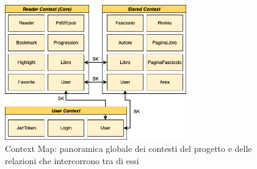 \begin{figure}[H]
\centering
\includegraphics[width=0.7\textwidth]{img/tesi-20-app-domain.drawio.png}
\caption{Context Map: panoramica globale dei contesti del progetto e delle relazioni che intercorrono tra di essi}
\end{figure}

